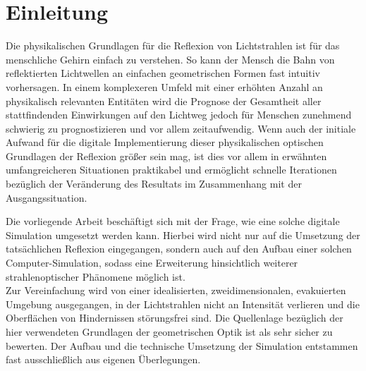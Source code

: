 \chapter{Einleitung}
Die physikalischen Grundlagen für die Reflexion von Lichtstrahlen 
ist für das menschliche Gehirn einfach zu verstehen. 
So kann der Mensch die Bahn von reflektierten Lichtwellen 
an einfachen geometrischen Formen fast intuitiv vorhersagen. 
In einem komplexeren Umfeld mit einer erhöhten Anzahl an 
physikalisch relevanten Entitäten wird die Prognose 
der Gesamtheit aller stattfindenden Einwirkungen auf den 
Lichtweg jedoch für Menschen zunehmend schwierig 
zu prognostizieren und vor allem zeitaufwendig.
Wenn auch der initiale Aufwand für die digitale Implementierung dieser physikalischen 
optischen Grundlagen der Reflexion größer sein mag, 
ist dies vor allem in erwähnten umfangreicheren Situationen praktikabel und ermöglicht 
schnelle Iterationen bezüglich der Veränderung 
des Resultats im Zusammenhang mit der Ausgangssituation. 

Die vorliegende Arbeit beschäftigt sich mit der Frage, 
wie eine solche digitale Simulation umgesetzt werden kann. 
Hierbei wird nicht nur auf die Umsetzung der tatsächlichen 
Reflexion eingegangen, sondern auch auf 
den Aufbau einer solchen Computer-Simulation, 
sodass eine Erweiterung hinsichtlich weiterer strahlenoptischer 
Phänomene möglich ist. \\ 
Zur Vereinfachung wird von einer idealisierten, zweidimensionalen, 
evakuierten Umgebung ausgegangen, 
in der Lichtstrahlen nicht an Intensität verlieren
und die Oberflächen von Hindernissen störungsfrei sind.
\newpage
Die Quellenlage bezüglich der hier verwendeten Grundlagen der geometrischen Optik ist als sehr sicher zu bewerten. 
Der Aufbau und die technische Umsetzung der Simulation entstammen fast ausschließlich aus eigenen Überlegungen.